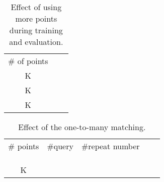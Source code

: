\documentclass[10pt,twocolumn,letterpaper]{article}
\begin{document}
\begin{table}[t]
\footnotesize
\renewcommand{\arraystretch}{1.2}
\centering
\begin{minipage}{1\linewidth}
{\begin{center}
\resizebox{1.0\linewidth}{!}
{
\begin{tabular}{c|cc}
  \# of points  &  &  \\
    \shline
  K &  &  \\
  K &  &  \\ 
  \rowcolor{gray!10}K &  &  \\ 
\end{tabular}
}
\end{center}}
\end{minipage}
\caption{\small Effect of using more points during training and evaluation.}
\label{tab:ablate_point_num}
\end{table}

\begin{table}[t]
\footnotesize
\renewcommand{\arraystretch}{1.2}
\centering
\begin{minipage}{1\linewidth}
{\begin{center}
\resizebox{1.0\linewidth}{!}
{
\begin{tabular}{ccc|cc}
   \# points & \#query & \#repeat number &  &  \\
    \shline
 \multirow{3}{*}{K} &
    &  &  &  \\
   &  &  &  &  \\
   &  &  &  & 
    \\ \hline
   \multirow{3}{*}{K} &  &  &  &  \\
   &  &  &  &  \\
   & \cellcolor{gray!10} & \cellcolor{gray!10} & \cellcolor{gray!10} & \cellcolor{gray!10}          
\end{tabular}
}
\end{center}}
\end{minipage}
\caption{\small Effect of the one-to-many matching.}
\label{tab:effect_one2many}
\end{table}
\end{document}
